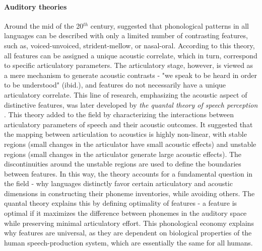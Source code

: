 \paragraph{Auditory theories}
Around the mid of the 20$^{th}$ century, \citet{jakobson1951preliminaries} suggested that phonological patterns in all languages can be described with only a limited number of contrasting features, such as, voiced-unvoiced, strident-mellow, or nasal-oral. According to this theory, all features can be assigned a unique acoustic correlate, which in turn, correspond to specific articulatory parameters. The articulatory stage, however, is viewed as a mere mechanism to generate acoustic contrasts - "we speak to be heard in order to be understood" (ibid.), and features do not necessarily have a unique articulatory correlate. This line of research, emphasizing the acoustic aspect of distinctive features, was later developed by \textit{the quantal theory of speech perception} \citep{stevens1972quantal,stevens1989quantal}. This theory added to the field by characterizing the interactions between articulatory parameters of speech and their acoustic outcomes. It suggested that the mapping between articulation to acoustics is highly non-linear, with stable regions (small changes in the articulator have small acoustic effects) and unstable regions (small changes in the articulator generate large acoustic effects). The discontinuities around the unstable regions are used to define the boundaries between features. In this way, the theory accounts for a fundamental question in the field - why languages distinctly favor certain articulatory and acoustic dimensions in constructing their phoneme inventories, while avoiding others. The quantal theory explains this by defining optimality of features - a feature is optimal if it maximizes the difference between phonemes in the auditory space while preserving minimal articulatory effort. This phonological economy explains why features are universal, as they are dependent on biological properties of the human speech-production system, which are essentially the same for all humans.

